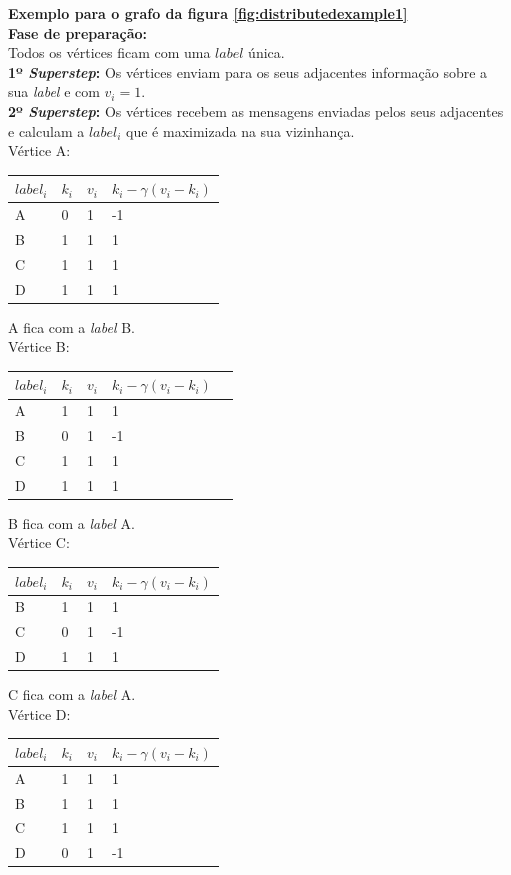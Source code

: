 \documentclass[a4paper,10pt]{report}
\begin{document}
{\bf Exemplo para o grafo da figura \ref{fig:distributedexample1}}
\\[0.25cm]
{\bf Fase de preparação:}\\
Todos os vértices ficam com uma $label$ única. 
\\[0.25cm]
{\bf 1º \textit{Superstep}:}
Os vértices enviam para os seus adjacentes 
informação sobre a sua \textit{label} e com $v_i=1$.
\\[0.25cm]
{\bf 2º \textit{Superstep}:}
Os vértices recebem as mensagens enviadas pelos seus adjacentes e calculam a 
$label_i$ que é maximizada na sua vizinhança.
\\[0.25cm]
Vértice A:
  \begin{tabular}{| l | l | l | l |}
  \hline
  $label_i$ & $k_i$ & $v_i$ & $k_i - \gamma(v_i - k_i)$\\ \hline
  A & 0 & 1 & -1 \\ \hline
  B & 1 & 1 & 1  \\ \hline
  C & 1 & 1 & 1  \\ \hline
  D & 1 & 1 & 1  \\ \hline
  \end{tabular}
  A fica com a \textit{label} B.
\\[0.25cm]
Vértice B:
  \begin{tabular}{| l | l | l | l | l |}
  \hline
  $label_i$ & $k_i$ & $v_i$ & $k_i - \gamma(v_i - k_i)$\\ \hline
  A & 1 & 1 & 1  \\ \hline
  B & 0 & 1 & -1 \\ \hline
  C & 1 & 1 & 1  \\ \hline
  D & 1 & 1 & 1  \\ \hline
  \end{tabular}
  B fica com a \textit{label} A.
\\[0.25cm]
Vértice C:
  \begin{tabular}{| l | l | l | l |}
  \hline
  $label_i$ & $k_i$ & $v_i$ & $k_i - \gamma(v_i - k_i)$\\ \hline
  B & 1 & 1 & 1 \\ \hline
  C & 0 & 1 & -1 \\ \hline
  D & 1 & 1 & 1 \\ \hline
  \end{tabular}
  C fica com a \textit{label} A.
\\[0.25cm]
Vértice D:
  \begin{tabular}{| l | l | l | l |}
  \hline
  $label_i$ & $k_i$ & $v_i$ & $k_i - \gamma(v_i - k_i)$\\ \hline
  A & 1 & 1 & 1  \\ \hline
  B & 1 & 1 & 1  \\ \hline
  C & 1 & 1 & 1  \\ \hline
  D & 0 & 1 & -1 \\ \hline
  \end{tabular}  
\end{document}
